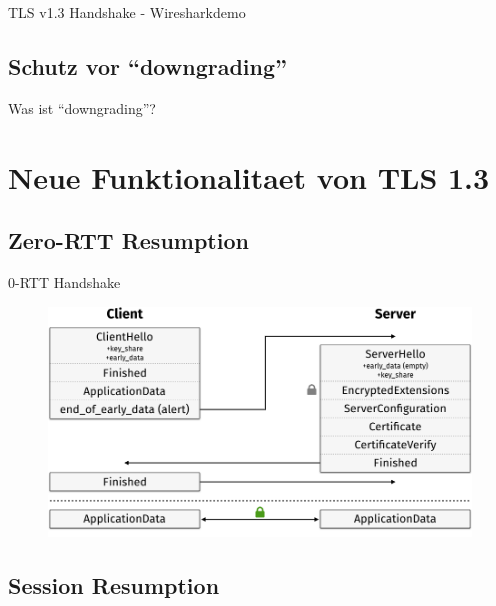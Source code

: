 \documentclass{f4_beamer_metropolis}
\begin{document}
\begin{frame}[standout]
  TLS v1.3 Handshake - Wiresharkdemo
\end{frame}

\subsection{Schutz vor \enquote{downgrading}}

\begin{frame}{Was ist \enquote{downgrading}?}

\end{frame}

\section{Neue Funktionalitaet von TLS 1.3}

\subsection{Zero-RTT Resumption}

\begin{frame}{0-RTT Handshake}
  \begin{figure}[!h]
    \centering
    \vspace*{-0.25cm}
    \includegraphics[width=\linewidth]{./images/tls13-handshake-zero-rtt.png}
    \label{fig:tls13-handshake-zero-rtt}
    \autocite{taubert}
  \end{figure}
\end{frame}

\subsection{Session Resumption}
\end{document}
